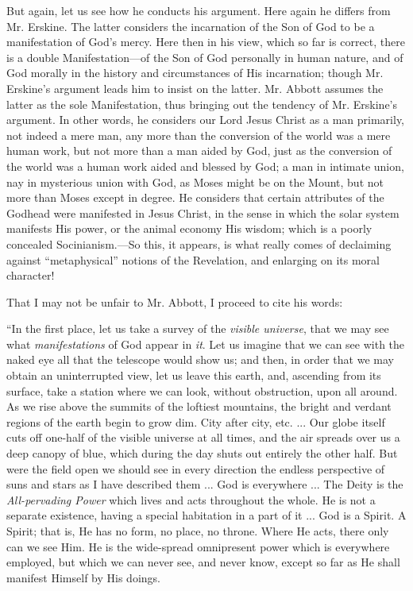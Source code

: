 But again, let us see how he conducts his
argument. Here again he differs from Mr. Erskine. The latter considers
the incarnation of the Son of God to be a manifestation of God's
mercy. Here then in his view, which so far is correct, there is a
double Manifestation—of the Son of God personally in human nature,
and of God morally in the history and circumstances of His
incarnation; though Mr. Erskine's argument leads him to insist on
the latter. Mr. Abbott assumes the latter as the sole Manifestation,
thus bringing out the tendency of Mr. Erskine's argument. In other
words, he considers our Lord Jesus Christ as a man primarily, not
indeed a mere man, any more than the conversion of the world was a
mere human work, but not more than a man aided by God, just as the
conversion of the world was a human work aided and blessed by God; a
man in intimate union, nay in mysterious union with God, as Moses
might be on the Mount, but not more than Moses except in degree. He
considers that certain attributes of the Godhead were manifested in
Jesus Christ, in the sense in which the solar system manifests His
power, or the animal economy His wisdom; which is a poorly concealed
Socinianism.—So this, it appears, is what really comes of declaiming
against ``metaphysical'' notions of the Revelation, and enlarging on
its moral character!

That I may not be unfair to Mr. Abbott, I proceed
to cite his words:

``In the first
place, let us take a survey of the \emph{visible universe}, that we
may see what \emph{manifestations} of God appear in \emph{it}. Let us imagine
that we can see with the naked eye all that the telescope would show
us; and then, in order that we may obtain an uninterrupted view, let
us leave this earth, and, ascending from its surface, take a station
where we can look, without obstruction, upon all around. As we rise
above the summits of the loftiest mountains, the bright and verdant
regions of the earth begin to grow dim. City after city, etc. ... Our
globe itself cuts off one-half of the visible universe at all times,
and the air spreads over us a deep canopy of blue, which during the
day shuts out entirely the other half. But were the field open we
should see in every direction the endless
perspective of suns and stars as I have described them ... God is
everywhere ... The Deity is the \emph{All-pervading Power} which lives
and acts throughout the whole. He is not a separate existence, having
a special habitation in a part of it ... God is a Spirit. A Spirit;
that is, He has no form, no place, no throne. Where He acts, there
only can we see Him. He is the wide-spread omnipresent power which is
everywhere employed, but which we can never see, and never know,
except so far as He shall manifest Himself by His doings.

